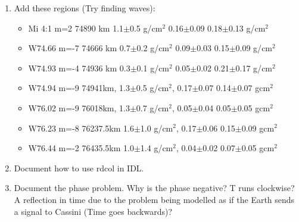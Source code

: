 \documentclass[crop=false,class=article,oneside]{standalone}
\begin{document}
\begin{enumerate}
            \item Add these regions (Try finding waves):
            \begin{itemize}
                \item Mi 4:1 m=2  74890 km  1.1$\pm$0.5 g/$\textrm{cm}^2$  0.16$\pm$0.09  0.18$\pm$0.13 g/$\textrm{cm}^2$
                \item W74.66 m=-7 74666 km  0.7$\pm$0.2 g/$\textrm{cm}^2$  0.09$\pm$0.03  0.15$\pm$0.09 g/$\textrm{cm}^2$
                \item W74.93 m=-4 74936 km  0.3$\pm$0.1 g/$\textrm{cm}^2$  0.05$\pm$0.02  0.21$\pm$0.17 g/$\textrm{cm}^2$
                \item W74.94 m=-9 74941km,  1.3$\pm$0.5 g/$\textrm{cm}^2$, 0.17$\pm$0.07  0.14$\pm$0.07 g$\textrm{cm}^2$
                \item W76.02 m=-9 76018km,  1.3$\pm$0.7 g/$\textrm{cm}^2$, 0.05$\pm$0.04  0.05$\pm$0.05 g$\textrm{cm}^2$
                \item W76.23 m=-8 76237.5km 1.6$\pm$1.0 g/$\textrm{cm}^2$, 0.17$\pm$0.06  0.15$\pm$0.09 g$\textrm{cm}^2$
                \item W76.44 m=-2 76435.5km 1.0$\pm$1.4 g/$\textrm{cm}^2$, 0.04$\pm$0.02  0.07$\pm$0.05 g$\textrm{cm}^2$
            \end{itemize}
            \begin{itemize}
            \end{itemize}
            \item Document how to use rdcol in IDL.
            \item Document the phase problem. Why is the phase
                  negative? T runs clockwise? A reflection in time due
                  to the problem being modelled as if the Earth sends
                  a signal to Cassini (Time goes backwards)?

\end{enumerate}
\end{document}
